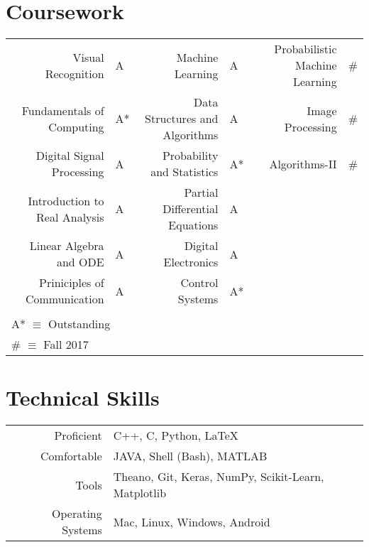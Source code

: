 \documentclass[a4paper,10pt]{article}
\begin{document}
\section{Coursework}
\centering
\begin{tabular}{rl|rl|rl}
Visual Recognition & A & Machine Learning & A & Probabilistic Machine Learning & \#\\
Fundamentals of Computing & A* & Data Structures and Algorithms & A & Image Processing & \#\\
Digital Signal Processing & A & Probability and Statistics & A* & Algorithms-II & \#\\
Introduction to Real Analysis & A & Partial Differential Equations & A\\
Linear Algebra and ODE & A & Digital Electronics & A\\
Priniciples of Communication & A & Control Systems & A*\\ \\

\multicolumn{4}{l}{\footnotesize A* $\equiv$ Outstanding}\\
\multicolumn{4}{l}{\footnotesize \# $\equiv$ Fall 2017}
\end{tabular}

\section{Technical Skills}
\begin{tabular}{rp{15cm}}
Proficient & C++, C, Python, \LaTeX\\
Comfortable & JAVA, Shell (Bash), MATLAB\\
Tools & Theano, Git, Keras, NumPy, Scikit-Learn, Matplotlib\\
Operating Systems & Mac, Linux, Windows, Android
\end{tabular}

\end{document}
